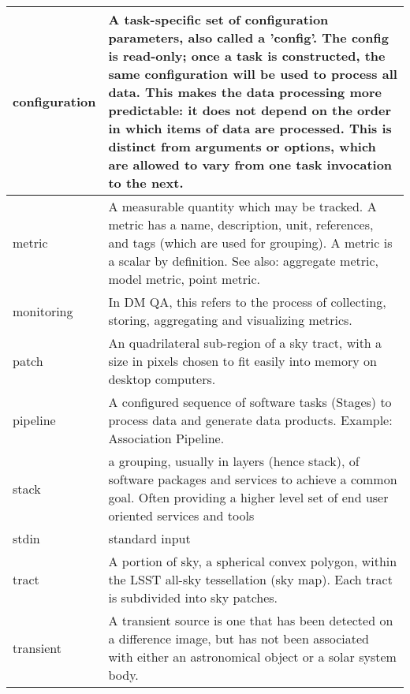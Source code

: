 \begin{longtable}{|p{}|p{}|}
configuration & A task-specific set of configuration parameters, also called a 'config'. The config is read-only; once a task is constructed, the same configuration will be used to process all data. This makes the data processing more predictable: it does not depend on the order in which items of data are processed. This is distinct from arguments or options, which are allowed to vary from one task invocation to the next. \\\hline
metric & A measurable quantity which may be tracked. A metric has a name, description, unit, references, and tags (which are used for grouping). A metric is a scalar by definition. See also: aggregate metric, model metric, point metric. \\\hline
monitoring & In DM QA, this refers to the process of collecting, storing, aggregating and visualizing metrics. \\\hline
patch & An quadrilateral sub-region of a sky tract, with a size in pixels chosen to fit easily into memory on desktop computers. \\\hline
pipeline & A configured sequence of software tasks (Stages) to process data and generate data products. Example: Association Pipeline. \\\hline
stack & a grouping, usually in layers (hence stack), of software packages and services to achieve a common goal. Often providing a higher level set of end user oriented services and tools \\\hline
stdin & standard input \\\hline
tract & A portion of sky, a spherical convex polygon, within the LSST all-sky tessellation (sky map). Each tract is subdivided into sky patches. \\\hline
transient & A transient source is one that has been detected on a difference image, but has not been associated with either an astronomical object or a solar system body. \\\hline
\end{longtable}
